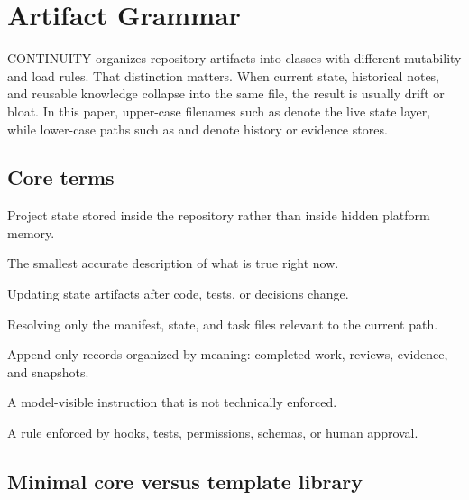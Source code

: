 
\section{Artifact Grammar}





CONTINUITY organizes repository artifacts into classes with different mutability and load rules. That distinction matters. When current state, historical notes, and reusable knowledge collapse into the same file, the result is usually drift or bloat. In this paper, upper-case filenames such as  denote the live state layer, while lower-case paths such as  and  denote history or evidence stores.



\subsection{Core terms}

\begin{description}[leftmargin=2.6cm,style=nextline]
  \item[Repository-native state] Project state stored inside the repository rather than inside hidden platform memory.
  \item[Current truth] The smallest accurate description of what is true right now.
  \item[State reconciliation] Updating state artifacts after code, tests, or decisions change.
  \item[Scoped loading] Resolving only the manifest, state, and task files relevant to the current path.
  \item[Semantic history] Append-only records organized by meaning: completed work, reviews, evidence, and snapshots.
  \item[Soft constraint] A model-visible instruction that is not technically enforced.
  \item[Hard constraint] A rule enforced by hooks, tests, permissions, schemas, or human approval.
\end{description}

\subsection{Minimal core versus template library}

